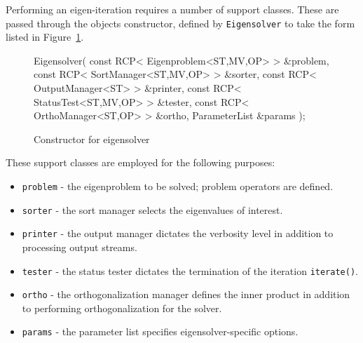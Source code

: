 \documentclass[acmtoms]{acmtrans2m}
\newcommand{\aspace}[1]{\texttt{#1}}
\begin{document}

Performing an eigen-iteration requires a number of support classes.  These are passed
through the objects constructor, defined by \aspace{Eigensolver} to take the form listed
in Figure~\ref{fig:constructor}.

\begin{figure}[htb]
\begin{center}
\begin{boxedverbatim}
Eigensolver(
   const RCP< Eigenproblem<ST,MV,OP> > &problem,
   const RCP< SortManager<ST,MV,OP>  > &sorter,
   const RCP< OutputManager<ST>      > &printer,
   const RCP< StatusTest<ST,MV,OP>   > &tester,
   const RCP< OrthoManager<ST,OP>    > &ortho,
   ParameterList                               &params
 );
\end{boxedverbatim}
\end{center}
\caption{Constructor for eigensolver}
\label{fig:constructor}
\end{figure}

These support classes are employed for the following purposes:
\begin{itemize}
  \item \verb!problem! - the eigenproblem to be solved; problem operators are
  defined.
  \item \verb!sorter! - the sort manager selects the
  eigenvalues of interest.
  \item \verb!printer! - the output manager dictates the verbosity level in addition to
    processing output streams.
  \item \verb!tester! - the status tester dictates the termination of the iteration
  \verb!iterate()!.
  \item \verb!ortho! - the orthogonalization manager defines the inner product
   in addition to performing orthogonalization for the solver.
  \item \verb!params! - the parameter list specifies eigensolver-specific
  options.
\end{itemize}
\end{document}
